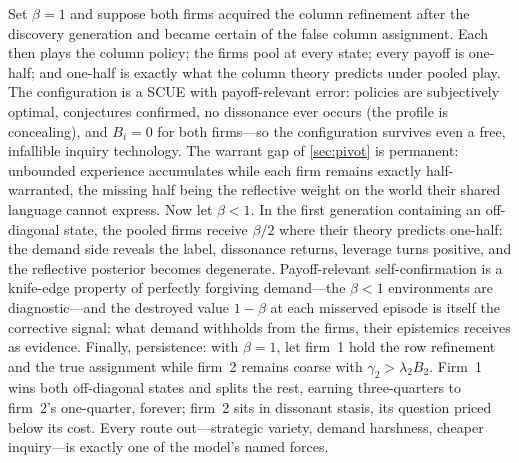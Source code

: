 \begin{excont}
Set $\beta=1$ and suppose both firms acquired the column refinement after
the discovery generation and became certain of the false column assignment.
Each then plays the column policy; the firms pool at every state; every
payoff is one-half; and one-half is exactly what the column theory predicts
under pooled play.  The configuration is a SCUE with payoff-relevant error:
policies are subjectively optimal, conjectures confirmed, no dissonance ever
occurs (the profile is concealing), and $B_i=0$ for both firms---so the
configuration survives even a free, infallible inquiry technology.  The
warrant gap of \cref{sec:pivot} is permanent: unbounded experience
accumulates while each firm remains exactly half-warranted, the missing half
being the reflective weight on the world their shared language cannot
express.  Now let $\beta<1$.  In the first generation containing an
off-diagonal state, the pooled firms receive $\beta/2$ where their theory
predicts one-half: the demand side reveals the label, dissonance returns,
leverage turns positive, and the reflective posterior becomes degenerate.
Payoff-relevant self-confirmation is a knife-edge property of perfectly
forgiving demand---the $\beta<1$ environments are diagnostic---and the
destroyed value $1-\beta$ at each misserved episode is itself the corrective
signal: what demand withholds from the firms, their epistemics receives as
evidence.  Finally, persistence: with $\beta=1$, let firm~1 hold the row
refinement and the true assignment while firm~2 remains coarse with
$\gamma_2>\lambda_2B_2$.  Firm~1 wins both off-diagonal states and splits
the rest, earning three-quarters to firm~2's one-quarter, forever; firm~2
sits in dissonant stasis, its question priced below its cost.  Every route
out---strategic variety, demand harshness, cheaper inquiry---is exactly one
of the model's named forces.
\end{excont}
